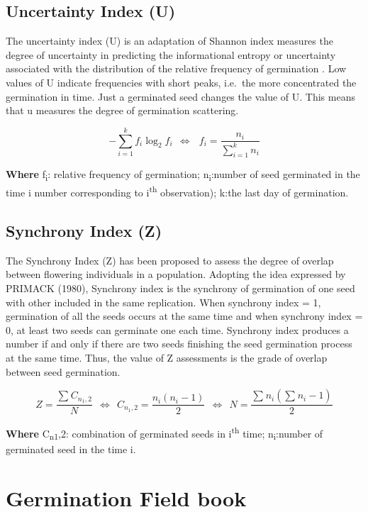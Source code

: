\documentclass[]{book}
\begin{document}
\section{Uncertainty Index (U)}\label{uncertainty-index-u}

The uncertainty index (U) is an adaptation of Shannon index measures the
degree of uncertainty in predicting the informational entropy or
uncertainty associated with the distribution of the relative frequency
of germination \citep{GouveaLabouriau1983, Labouriau1983}. Low values of
U indicate frequencies with short peaks, i.e.~the more concentrated the
germination in time. Just a germinated seed changes the value of U. This
means that u measures the degree of germination scattering.

\[ -\sum_{i=1}^kf_i\log_2f_i\ \ \Leftrightarrow\ \ \ f_i=\frac{n_i}{\sum_{i=1}^kn_i}  \]

\textbf{Where} f\textsubscript{i}: relative frequency of germination;
n\textsubscript{i}:number of seed germinated in the time i number
corresponding to i\textsuperscript{th} observation); k:the last day of
germination.

\section{Synchrony Index (Z)}\label{synchrony-index-z}

The Synchrony Index (Z) has been proposed to assess the degree of
overlap between flowering individuals in a population. Adopting the idea
expressed by PRIMACK (1980), Synchrony index is the synchrony of
germination of one seed with other included in the same replication.
When synchrony index = 1, germination of all the seeds occurs at the
same time and when synchrony index = 0, at least two seeds can germinate
one each time. Synchrony index produces a number if and only if there
are two seeds finishing the seed germination process at the same time.
Thus, the value of Z assessments is the grade of overlap between seed
germination.

\[Z=\frac{\sum_{ }^{ }C_{n_1,2}}{N}\ \ \Leftrightarrow\ \ C_{n_1,2}=\frac{n_i\left(n_i-1\right)}{2}\ \ \Leftrightarrow\ \ N=\frac{\sum_{ }^{ }n_i\left(\sum_{ }^{ }n_i-1\right)}{2}\]

\textbf{Where} C\textsubscript{n1},2: combination of germinated seeds in
i\textsuperscript{th} time; n\textsubscript{i}:number of germinated seed
in the time i.

\chapter{Germination Field book}\label{germination-field-book}
\end{document}
